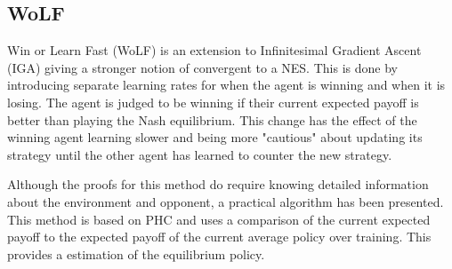 \documentclass[conference]{IEEEtran}
\begin{document}

\subsection{WoLF}

Win or Learn Fast (WoLF) is an extension to Infinitesimal Gradient Ascent (IGA)\cite{singh2000nash} giving a stronger notion of convergent to a NES. This is done by introducing separate learning rates for when the agent is winning and when it is losing. The agent is judged to be winning if their current expected payoff is better than playing the Nash equilibrium. This change has the effect of the winning agent learning slower and being more "cautious" about updating its strategy until the other agent has learned to counter the new strategy.


Although the proofs for this method do require knowing detailed information about the environment and opponent, a practical algorithm has been presented. This method is based on PHC and uses a comparison of the current expected payoff to the expected payoff of the current average policy over training. This provides a estimation of the equilibrium policy.
\end{document}
